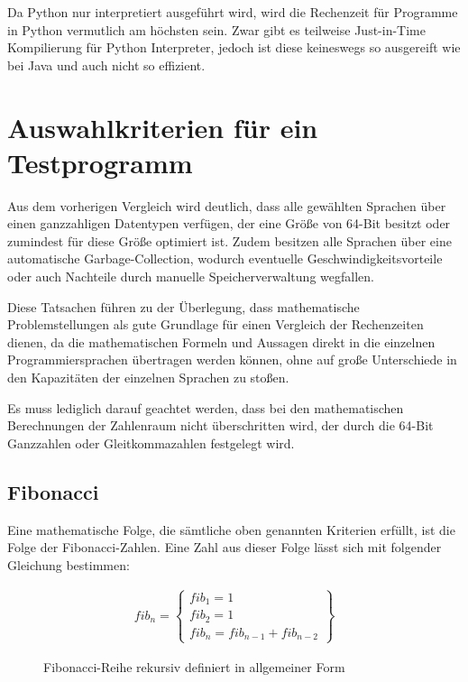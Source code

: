 \documentclass[11pt, parskip=half]{scrartcl}       %
\begin{document}
Da Python nur interpretiert ausgeführt wird, wird die Rechenzeit für Programme in Python vermutlich am höchsten sein.
Zwar gibt es teilweise Just-in-Time Kompilierung für Python Interpreter, jedoch ist diese keineswegs so ausgereift wie bei Java und auch nicht so effizient.


\section{Auswahlkriterien für ein Testprogramm}

Aus dem vorherigen Vergleich wird deutlich, dass alle gewählten Sprachen über einen ganzzahligen Datentypen verfügen, der eine Größe von 64-Bit besitzt oder zumindest für diese Größe optimiert ist.
Zudem besitzen alle Sprachen über eine automatische Garbage-Collection, wodurch eventuelle Geschwindigkeitsvorteile oder auch Nachteile durch manuelle Speicherverwaltung wegfallen.

Diese Tatsachen führen zu der Überlegung, dass mathematische Problemstellungen als gute Grundlage für einen Vergleich der Rechenzeiten dienen, da die mathematischen Formeln und Aussagen direkt in die einzelnen Programmiersprachen übertragen werden können, ohne auf große Unterschiede in den Kapazitäten der einzelnen Sprachen zu stoßen.

Es muss lediglich darauf geachtet werden, dass bei den mathematischen Berechnungen der Zahlenraum nicht überschritten wird, der durch die 64-Bit Ganzzahlen oder Gleitkommazahlen festgelegt wird.


\subsection{Fibonacci}

Eine mathematische Folge, die sämtliche oben genannten Kriterien erfüllt, ist die Folge der Fibonacci-Zahlen.
Eine Zahl aus dieser Folge lässt sich mit folgender Gleichung bestimmen:

\begin{figure}[h]
  \centering
  \begin{gather*}
    fib _{n} = \left.
      \begin{cases}
        fib_{1} = 1 \\
        fib_{2} = 1 \\
        fib_{n} = fib_{n-1} + fib_{n-2}
      \end{cases}
    \right\}    
  \end{gather*}
  \caption{Fibonacci-Reihe rekursiv definiert in allgemeiner Form}
  \label{fig:fib1}
\end{figure}
\end{document}
